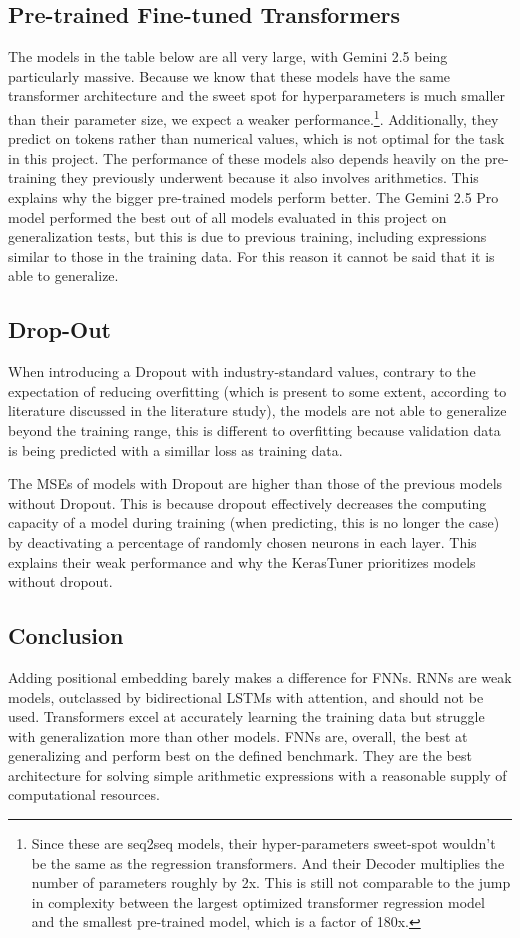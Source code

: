 \documentclass{article}
\begin{document}
\subsection{Pre-trained Fine-tuned Transformers}
The models in the table below are all very large, with Gemini 2.5 being particularly massive. Because we know that these models have the same transformer architecture and the sweet spot for hyperparameters is much smaller than their parameter size, we expect a weaker performance.\footnote{Since these are seq2seq models, their hyper-parameters sweet-spot wouldn't be the same as the regression transformers. And their Decoder multiplies the number of parameters roughly by 2x. This is still not comparable to the jump in complexity between the largest optimized transformer regression model and the smallest pre-trained model, which is a factor of 180x.}. Additionally, they predict on tokens rather than numerical values, which is not optimal for the task in this project. The performance of these models also depends heavily on the pre-training they previously underwent because it also involves arithmetics. This explains why the bigger pre-trained models perform better. The Gemini 2.5 Pro model performed the best out of all models evaluated in this project on generalization tests, but this is due to previous training, including expressions similar to those in the training data. For this reason it cannot be said that it is able to generalize.

\subsection{Drop-Out}
When introducing a Dropout with industry-standard values, contrary to the expectation of reducing overfitting (which is present to some extent, according to literature discussed in the literature study), the models are not able to generalize beyond the training range, this is different to overfitting because validation data is being predicted with a simillar loss as training data.

The MSEs of models with Dropout are higher than those of the previous models without Dropout. This is because dropout effectively decreases the computing capacity of a model during training (when predicting, this is no longer the case) by deactivating a percentage of randomly chosen neurons in each layer. This explains their weak performance and why the KerasTuner prioritizes models without dropout.


\subsection{Conclusion}
Adding positional embedding barely makes a difference for FNNs.
RNNs are weak models, outclassed by bidirectional LSTMs with attention, and should not be used.
Transformers excel at accurately learning the training data but struggle with generalization more than other models.
FNNs are, overall, the best at generalizing and perform best on the defined benchmark. They are the best architecture for solving simple arithmetic expressions with a reasonable supply of computational resources.
\end{document}
